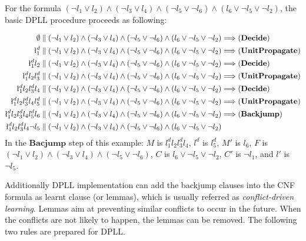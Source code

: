 \begin{example}
For the formula $(\neg l_1 \vee l_2) \wedge (\neg l_3 \vee l_4) \wedge (\neg l_5 \vee \neg l_6) \wedge (l_6 \vee \neg l_5 \vee \neg l_2)$, the basic DPLL procedure proceeds as following:

\begin{align*}
\emptyset &\parallel (\neg l_1 \vee l_2) \wedge (\neg l_3 \vee l_4) \wedge (\neg l_5 \vee \neg l_6) \wedge (l_6 \vee \neg l_5 \vee \neg l_2) \Longrightarrow (\mathbf{Decide}) \\
\l_1^d &\parallel (\neg l_1 \vee l_2) \wedge (\neg l_3 \vee l_4) \wedge (\neg l_5 \vee \neg l_6) \wedge (l_6 \vee \neg l_5 \vee \neg l_2) \Longrightarrow (\mathbf{UnitPropagate}) \\
\l_1^dl_2 &\parallel (\neg l_1 \vee l_2) \wedge (\neg l_3 \vee l_4) \wedge (\neg l_5 \vee \neg l_6) \wedge (l_6 \vee \neg l_5 \vee \neg l_2) \Longrightarrow (\mathbf{Decide}) \\
\l_1^dl_2l_3^d &\parallel (\neg l_1 \vee l_2) \wedge (\neg l_3 \vee l_4) \wedge (\neg l_5 \vee \neg l_6) \wedge (l_6 \vee \neg l_5 \vee \neg l_2) \Longrightarrow (\mathbf{UnitPropagate}) \\
\l_1^dl_2l_3^dl_4 &\parallel (\neg l_1 \vee l_2) \wedge (\neg l_3 \vee l_4) \wedge (\neg l_5 \vee \neg l_6) \wedge (l_6 \vee \neg l_5 \vee \neg l_2) \Longrightarrow (\mathbf{Decide})\\
\l_1^dl_2l_3^dl_4l_5^d &\parallel (\neg l_1 \vee l_2) \wedge (\neg l_3 \vee l_4) \wedge (\neg l_5 \vee \neg l_6) \wedge (l_6 \vee \neg l_5 \vee \neg l_2) \Longrightarrow (\mathbf{UnitPropagate})\\
\l_1^dl_2l_3^dl_4l_5^dl_6 &\parallel (\neg l_1 \vee l_2) \wedge (\neg l_3 \vee l_4) \wedge (\neg l_5 \vee \neg l_6) \wedge (l_6 \vee \neg l_5 \vee \neg l_2) \Longrightarrow (\mathbf{Backjump})\\
\l_1^dl_2l_3^dl_4\neg l_5 &\parallel (\neg l_1 \vee l_2) \wedge (\neg l_3 \vee l_4) \wedge (\neg l_5 \vee \neg l_6) \wedge (l_6 \vee \neg l_5 \vee \neg l_2)
\end{align*}
\sloppy
In the $\mathbf{Bacjump}$ step of this example: $M$ is $l_1^dl_2l_3^dl_4$, $l^d$ is $l_5^d$, 
$M'$ is $l_6$,
$F$ is ${(\neg l_1 \vee l_2) \wedge (\neg l_3 \vee l_4) \wedge (\neg l_5 \vee \neg l_6)}$,
$C$ is $l_6 \vee \neg l_5 \vee \neg l_2$,
$C'$ is $\neg l_1$, and $l'$ is $\neg l_5$.
\end{example}

Additionally DPLL implementation can add the backjump clauses into the CNF formula as learnt clause (or lemmas), which is usually referred as \emph{conflict-driven learning}. Lemmas aim at preventing similar conflicts to occur in the future. When the conflicts are not likely to happen, the lemmas can be removed. The following two rules are prepared for DPLL.

